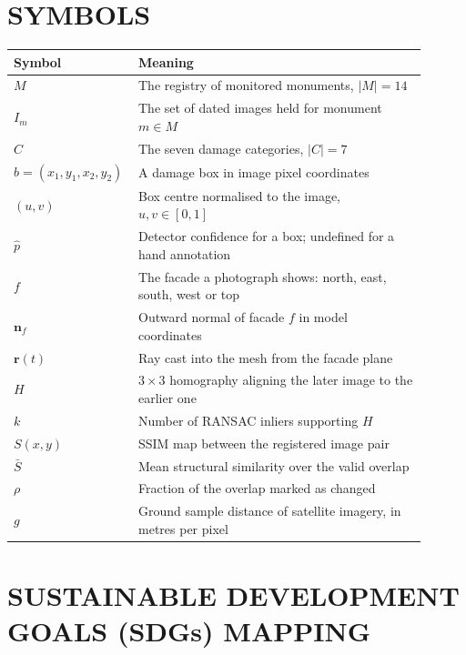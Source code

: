 \documentclass[a4paper,12pt,oneside]{book}
\begin{document}
\clearpage
{}
{}
\chapter*{SYMBOLS}

\begin{center}
\renewcommand{\arraystretch}{1.35}
\begin{tabular}{|p{0.22\linewidth}|p{0.68\linewidth}|}
\hline
\textbf{Symbol} & \textbf{Meaning} \\ \hline
$M$ & The registry of monitored monuments, $|M| = 14$ \\ \hline
$I_m$ & The set of dated images held for monument $m \in M$ \\ \hline
$C$ & The seven damage categories, $|C| = 7$ \\ \hline
$b = (x_1, y_1, x_2, y_2)$ & A damage box in image pixel coordinates \\ \hline
$(u, v)$ & Box centre normalised to the image, $u, v \in [0, 1]$ \\ \hline
$\hat{p}$ & Detector confidence for a box; undefined for a hand annotation \\ \hline
$f$ & The facade a photograph shows: north, east, south, west or top \\ \hline
$\mathbf{n}_f$ & Outward normal of facade $f$ in model coordinates \\ \hline
$\mathbf{r}(t)$ & Ray cast into the mesh from the facade plane \\ \hline
$H$ & $3\times3$ homography aligning the later image to the earlier one \\ \hline
$k$ & Number of RANSAC inliers supporting $H$ \\ \hline
$S(x, y)$ & SSIM map between the registered image pair \\ \hline
$\bar{S}$ & Mean structural similarity over the valid overlap \\ \hline
$\rho$ & Fraction of the overlap marked as changed \\ \hline
$g$ & Ground sample distance of satellite imagery, in metres per pixel \\ \hline
\end{tabular}
\end{center}

\clearpage
{}
{}
\chapter*{SUSTAINABLE DEVELOPMENT GOALS (SDGs) MAPPING}
\end{document}
